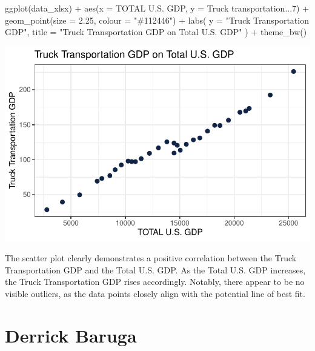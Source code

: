 \documentclass[
  letterpaper,
  DIV=11,
  numbers=noendperiod]{scrreprt}
\newenvironment{Shaded}{\begin{snugshade}}{\end{snugshade}}
\newcommand{\AttributeTok}[1]{\textcolor[rgb]{0.40,0.45,0.13}{#1}}
\newcommand{\FloatTok}[1]{\textcolor[rgb]{0.68,0.00,0.00}{#1}}
\newcommand{\FunctionTok}[1]{\textcolor[rgb]{0.28,0.35,0.67}{#1}}
\newcommand{\NormalTok}[1]{\textcolor[rgb]{0.00,0.23,0.31}{#1}}
\newcommand{\SpecialCharTok}[1]{\textcolor[rgb]{0.37,0.37,0.37}{#1}}
\newcommand{\StringTok}[1]{\textcolor[rgb]{0.13,0.47,0.30}{#1}}
\begin{document}
\begin{Shaded}
\begin{Highlighting}[]
\FunctionTok{ggplot}\NormalTok{(data\_xlsx) }\SpecialCharTok{+}
  \FunctionTok{aes}\NormalTok{(}\AttributeTok{x =} \StringTok{\textasciigrave{}}\AttributeTok{TOTAL U.S. GDP}\StringTok{\textasciigrave{}}\NormalTok{, }\AttributeTok{y =} \StringTok{\textasciigrave{}}\AttributeTok{Truck transportation...7}\StringTok{\textasciigrave{}}\NormalTok{) }\SpecialCharTok{+}
  \FunctionTok{geom\_point}\NormalTok{(}\AttributeTok{size =} \FloatTok{2.25}\NormalTok{, }\AttributeTok{colour =} \StringTok{"\#112446"}\NormalTok{) }\SpecialCharTok{+}
  \FunctionTok{labs}\NormalTok{(}
    \AttributeTok{y =} \StringTok{"Truck Transportation GDP"}\NormalTok{,}
    \AttributeTok{title =} \StringTok{"Truck Transportation GDP on Total U.S. GDP"}
\NormalTok{  ) }\SpecialCharTok{+}
  \FunctionTok{theme\_bw}\NormalTok{()}
\end{Highlighting}
\end{Shaded}

\includegraphics{FinalProject_Caleb_files/figure-pdf/unnamed-chunk-3-1.pdf}

The scatter plot clearly demonstrates a positive correlation between the
Truck Transportation GDP and the Total U.S. GDP. As the Total U.S. GDP
increases, the Truck Transportation GDP rises accordingly. Notably,
there appear to be no visible outliers, as the data points closely align
with the potential line of best fit.

\chapter{Derrick Baruga}\label{derrick-baruga-1}
\end{document}
